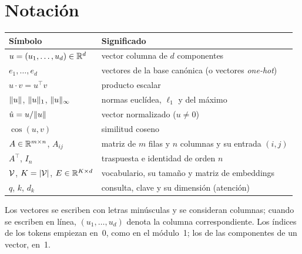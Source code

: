 \documentclass[11pt,a4paper,twoside,openany]{book}
\begin{document}
\section*{Notación}
\begin{center}
\begin{tabular}{@{}ll@{}}
\toprule
Símbolo & Significado \\
\midrule
$u=(u_1,\dots,u_d)\in\mathbb{R}^{d}$ & vector columna de $d$ componentes \\
$e_1,\dots,e_d$ & vectores de la base canónica (o vectores \emph{one-hot}) \\
$u\cdot v=u^{\top}v$ & producto escalar \\
$\lVert u\rVert$, $\lVert u\rVert_1$, $\lVert u\rVert_\infty$ & normas euclídea, $\ell_1$ y del máximo \\
$\hat u=u/\lVert u\rVert$ & vector normalizado ($u\neq 0$) \\
$\cos(u,v)$ & similitud coseno \\
$A\in\mathbb{R}^{m\times n}$, $A_{ij}$ & matriz de $m$ filas y $n$ columnas y su entrada $(i,j)$ \\
$A^{\top}$, $I_n$ & traspuesta e identidad de orden $n$ \\
$\mathcal{V}$, $K=\lvert\mathcal{V}\rvert$, $E\in\mathbb{R}^{K\times d}$ & vocabulario, su tamaño y matriz de embeddings \\
$q$, $k$, $d_k$ & consulta, clave y su dimensión (atención) \\
\bottomrule
\end{tabular}
\end{center}

Los vectores se escriben con letras minúsculas y se consideran columnas; cuando se escriben en línea, $(u_1,\dots,u_d)$ denota la columna correspondiente. Los índices de los tokens empiezan en~0, como en el módulo~1; los de las componentes de un vector, en~1.


\tableofcontents

\mainmatter






\backmatter

\end{document}
